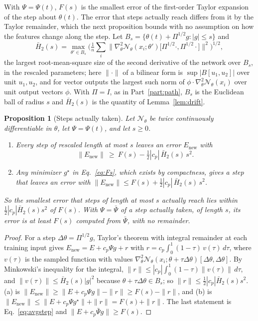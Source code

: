 \documentclass[11pt]{article}
\newtheorem{proposition}{Proposition}
\theoremstyle{definition}
\theoremstyle{remark}
\newcommand{\Net}{\mathcal{N}_\theta}    %
\begin{document}
With $\Psi = \Psi(t)$, $F(s)$ is the smallest error of the first-order Taylor expansion of the step about $\theta(t)$.
The error that steps actually reach differs from it by the Taylor remainder, which the next proposition bounds with no assumption on how the features change along the step.
Let $B_s = \{\theta(t) + \Pi^{1/2}g : |g|\le s\}$ and
\begin{equation}\label{eq:H2bar1}
\bar H_2(s) = \max_{\theta'\in B_s}\Big(\tfrac1n\sum_i\big\|\nabla^2_\theta\Net(x_i;\theta')\big[\Pi^{1/2}\cdot,\Pi^{1/2}\cdot\big]\big\|^2\Big)^{1/2},
\end{equation}
the largest root-mean-square size of the second derivative of the network over $B_s$, in the rescaled parameters; here $\|\cdot\|$ of a bilinear form is $\sup|B[u_1,u_2]|$ over unit $u_1,u_2$, and for vector outputs the largest such norm of $\phi\cdot\nabla^2_\theta\Net(x_i)$ over unit output vectors $\phi$.
With $\Pi = I$, as in Part~\ref{part:path}, $B_s$ is the Euclidean ball of radius $s$ and $\bar H_2(s)$ is the quantity of Lemma~\ref{lem:drift}.

\begin{proposition}[Steps actually taken]\label{prop:taylorstep}
Let $\Net$ be twice continuously differentiable in $\theta$, let $\Psi = \Psi(t)$, and let $s \ge 0$.
\begin{enumerate}[label=(\alph*)]
\item Every step of rescaled length at most $s$ leaves an error $E_{\mathrm{new}}$ with
\[
\|E_{\mathrm{new}}\| \ \ge\ F(s) - \tfrac12|c_p|\,\bar H_2(s)\,s^2 .
\]
\item Any minimizer $g^\star$ in Eq.~\eqref{eq:Fs}, which exists by compactness, gives a step that leaves an error with $\|E_{\mathrm{new}}\| \le F(s) + \tfrac12|c_p|\,\bar H_2(s)\,s^2$.
\end{enumerate}
So the smallest error that steps of length at most $s$ actually reach lies within $\tfrac12|c_p|\bar H_2(s)s^2$ of $F(s)$.
With $\Psi = \bar\Psi$ of a step actually taken, of length $s$, its error is at least $F(s)$ computed from $\bar\Psi$, with no remainder.
\end{proposition}

\begin{proof}
For a step $\Delta\theta = \Pi^{1/2}g$, Taylor's theorem with integral remainder at each training input gives $E_{\mathrm{new}} = E + c_p\Psi g + r$ with $r = c_p\int_0^1(1-\tau)\,v(\tau)\,d\tau$, where $v(\tau)$ is the sampled function with values $\nabla^2_\theta\Net(x_i;\theta + \tau\Delta\theta)[\Delta\theta,\Delta\theta]$.
By Minkowski's inequality for the integral, $\|r\|\le|c_p|\int_0^1(1-\tau)\|v(\tau)\|\,d\tau$, and $\|v(\tau)\|\le\bar H_2(s)|g|^2$ because $\theta + \tau\Delta\theta\in B_s$; so $\|r\|\le\tfrac12|c_p|\bar H_2(s)s^2$.
(a) is $\|E_{\mathrm{new}}\|\ge\|E + c_p\Psi g\| - \|r\|\ge F(s) - \|r\|$, and (b) is $\|E_{\mathrm{new}}\|\le\|E + c_p\Psi g^\star\| + \|r\| = F(s) + \|r\|$.
The last statement is Eq.~\eqref{eq:avgstep} and $\|E + c_p\bar\Psi g\|\ge F(s)$.
\end{proof}
\end{document}
